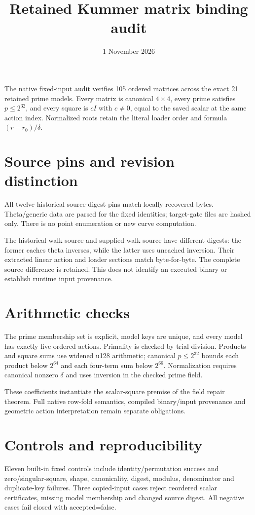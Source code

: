 \documentclass[10pt]{article}\usepackage[margin=0.8in]{geometry}\usepackage[T1]{fontenc}\usepackage{lmodern,amsmath,hyperref}
\title{Retained Kummer matrix binding audit}\date{1 November 2026}
\begin{document}
\maketitle
The native fixed-input audit verifies 105 ordered matrices across the exact 21 retained prime models. Every matrix is canonical $4\times4$, every prime satisfies $p\le2^{32}$, and every square is $cI$ with $c\ne0$, equal to the saved scalar at the same action index. Normalized roots retain the literal loader order and formula $(r-r_0)/\delta$.
\section*{Source pins and revision distinction}
All twelve historical source-digest pins match locally recovered bytes. Theta/generic data are parsed for the fixed identities; target-gate files are hashed only. There is no point enumeration or new curve computation.

The historical walk source and supplied walk source have different digests: the former caches theta inverses, while the latter uses uncached inversion. Their extracted linear action and loader sections match byte-for-byte. The complete source difference is retained. This does not identify an executed binary or establish runtime input provenance.
\section*{Arithmetic checks}
The prime membership set is explicit, model keys are unique, and every model has exactly five ordered actions. Primality is checked by trial division. Products and square sums use widened u128 arithmetic; canonical $p\le2^{32}$ bounds each product below $2^{64}$ and each four-term sum below $2^{66}$. Normalization requires canonical nonzero $\delta$ and uses inversion in the checked prime field.

These coefficients instantiate the scalar-square premise of the field repair theorem. Full native row-fold semantics, compiled binary/input provenance and geometric action interpretation remain separate obligations.
\section*{Controls and reproducibility}
Eleven built-in fixed controls include identity/permutation success and zero/singular-square, shape, canonicality, digest, modulus, denominator and duplicate-key failures. Three copied-input cases reject reordered scalar certificates, missing model membership and changed source digest. All negative cases fail closed with accepted=false.
\end{document}

